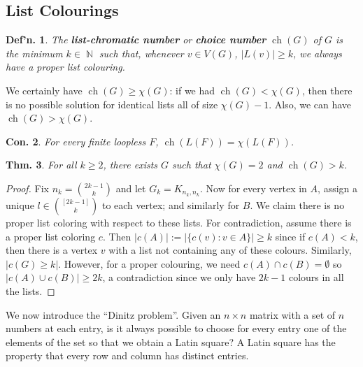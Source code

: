 \documentclass[12pt, a4paper]{book}
\DeclareMathOperator{\N}{\mathbb{N}}
\DeclareMathOperator{\ch}{ch}
\newtheorem{theorem}{Thm.}[section]
\newtheorem{conjecture}[theorem]{Con.}
\newtheorem{definition}[theorem]{Def'n.}
\theoremstyle{nonumberplain}
\newtheorem{proof}{Proof}
\begin{document}
\subsection{List Colourings}
\begin{definition}
    The \textbf{list-chromatic number} or \textbf{choice number} $\ch(G)$ of $G$ is the minimum $k\in\N$ such that, whenever $v\in V(G)$, $|L(v)|\geq k$, we always have a proper list colouring.
\end{definition}
We certainly have $\ch(G)\geq\chi(G)$: if we had $\ch(G)<\chi(G)$, then there is no possible solution for identical lists all of size $\chi(G)-1$.
Also, we can have $\ch(G)>\chi(G)$.
\begin{center}
\end{center}
\begin{conjecture}
    For every finite loopless $F$, $\ch(L(F))=\chi(L(F))$.
\end{conjecture}
\begin{theorem}
    For all $k\geq 2$, there exists $G$ such that $\chi(G)=2$ and $\ch(G)>k$.
\end{theorem}
\begin{proof}
    Fix $n_k=\binom{2k-1}{k}$ and let $G_k=K_{n_k,n_k}$.
    Now for every vertex in $A$, assign a unique $l\in\binom{[2k-1]}{k}$ to each vertex; and similarly for $B$.
    We claim there is no proper list coloring with respect to these lists.
    For contradiction, assume there is a proper list coloring $c$.
    Then $|c(A)|:=|\{c(v):v\in A\}|\geq k$ since if $c(A)<k$, then there is a vertex $v$ with a list not containing any of these colours.
    Similarly, $|c(G)\geq k|$.
    However, for a proper colouring, we need $c(A)\cap c(B)=\emptyset$ so $|c(A)\cup c(B)|\geq 2k$, a contradiction since we only have $2k-1$ colours in all the lists.
\end{proof}
We now introduce the ``Dinitz problem''.
Given an $n\times n$ matrix with a set of $n$ numbers at each entry, is it always possible to choose for every entry one of the elements of the set so that we obtain a Latin square?
A Latin square has the property that every row and column has distinct entries.
\end{document}
